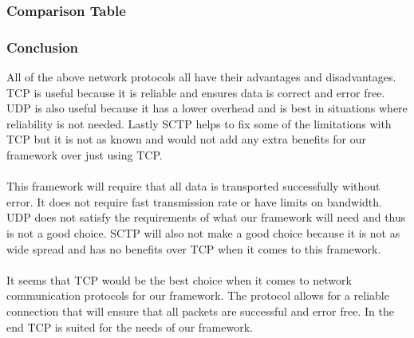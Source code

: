 \subsubsection{Comparison Table}
\FloatBarrier
\begin{table}[H]
\fontsize{3}{4}\selectfont
\centering
\def\arraystretch{1.2}
\newline\newline 
\end{table}
\subsubsection{Conclusion}
All of the above network protocols all have their advantages and disadvantages. TCP is useful because it is reliable and ensures data is correct and error free. UDP is also useful because it has a lower overhead and is best in situations where reliability is not needed. Lastly SCTP helps to fix some of the limitations with TCP but it is not as known and would not add any extra benefits for our framework over just using TCP.
\\ \\
This framework will require that all data is transported successfully without error. It does not require fast transmission rate or have limits on bandwidth. UDP does not satisfy the requirements of what our framework will need and thus is not a good choice. SCTP will also not make a good choice because it is not as wide spread and has no benefits over TCP when it comes to this framework. 
\\ \\
It seems that TCP would be the best choice when it comes to network communication protocols for our framework. The protocol allows for a reliable connection that will ensure that all packets are successful and error free. In the end TCP is suited for the needs of our framework.



